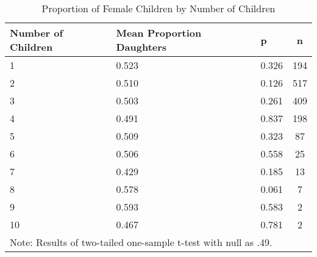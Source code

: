 \begin{table}[!htb]
\centering
\caption{Proportion of Female Children by Number of Children} 
\label{tab:balance_prop_female_nchild}
\begingroup\small
\begin{tabular}{lllc}
  \hline
Number of Children & Mean Proportion Daughters & p & n \\ 
  \hline
   1 & 0.523 & 0.326 &  194 \\ 
     2 & 0.510 & 0.126 &  517 \\ 
     3 & 0.503 & 0.261 &  409 \\ 
     4 & 0.491 & 0.837 &  198 \\ 
     5 & 0.509 & 0.323 &   87 \\ 
     6 & 0.506 & 0.558 &   25 \\ 
     7 & 0.429 & 0.185 &   13 \\ 
     8 & 0.578 & 0.061 &    7 \\ 
     9 & 0.593 & 0.583 &    2 \\ 
    10 & 0.467 & 0.781 &    2 \\ 
   \hline 
 \multicolumn{3}{l}{\scriptsize{Note: Results of two-tailed one-sample t-test with null as .49.}} \hline
\end{tabular}
\endgroup
\end{table}
